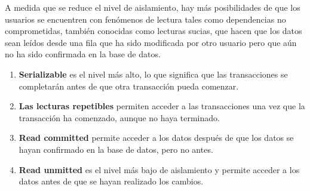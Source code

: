 \documentclass{article}
\begin{document}
A medida que se reduce el nivel de aislamiento, hay más posibilidades de que los usuarios se encuentren con fenómenos de lectura tales como dependencias no comprometidas, también conocidas como lecturas sucias, que hacen que los datos sean leídos desde una fila que ha sido modificada por otro usuario pero que aún no ha sido confirmada en la base de datos.

    \begin{enumerate}
    \item \textbf{Serializable} es el nivel más alto, lo que significa que las transacciones se completarán antes de que otra transacción pueda comenzar.
    \item \textbf{Las lecturas repetibles} permiten acceder a las transacciones una vez que la transacción ha comenzado, aunque no haya terminado.
    \item \textbf{Read committed} permite acceder a los datos después de que los datos se hayan confirmado en la base de datos, pero no antes.
    
    \item \textbf{Read unmitted} es el nivel más bajo de aislamiento y permite acceder a los datos antes de que se hayan realizado los cambios.
    
    \end{enumerate}




\printbibliography
\end{document}
